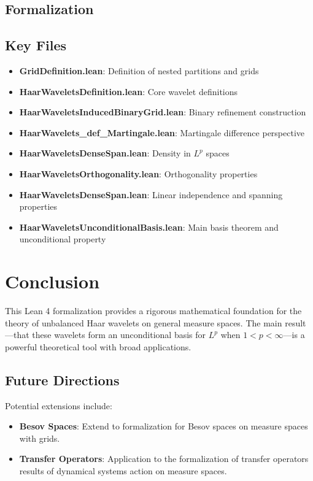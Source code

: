 \documentclass[12pt,a4paper]{article}
\theoremstyle{definition}
\newcommand{\Lp}[1]{L^{#1}}
\begin{document}
 
\newpage

 \subsection{Formalization} 
\subsection{Key Files}

\begin{itemize}
  \item \textbf{GridDefinition.lean}: Definition of nested partitions and grids
  \item \textbf{HaarWaveletsDefinition.lean}: Core wavelet definitions
  \item \textbf{HaarWaveletsInducedBinaryGrid.lean}: Binary refinement construction
  \item \textbf{HaarWavelets\_def\_Martingale.lean}: Martingale difference perspective
  \item \textbf{HaarWaveletsDenseSpan.lean}: Density in $\Lp{p}$ spaces
  \item \textbf{HaarWaveletsOrthogonality.lean}: Orthogonality properties
  \item \textbf{HaarWaveletsDenseSpan.lean}: Linear independence and spanning properties
  \item \textbf{HaarWaveletsUnconditionalBasis.lean}: Main basis theorem and unconditional property
\end{itemize}

\newpage

\section{Conclusion}

This Lean 4 formalization provides a rigorous mathematical foundation for the theory of unbalanced Haar wavelets on general measure spaces. The main result—that these wavelets form an unconditional basis for $\Lp{p}$ when $1 < p < \infty$—is a powerful theoretical tool with broad applications.

\subsection{Future Directions}

Potential extensions   include:

\begin{itemize}
  \item \textbf{Besov Spaces}: Extend to formalization for   Besov spaces on measure spaces with grids. 
  \item \textbf{Transfer Operators}: Application to the formalization of   transfer operators results of dynamical systems action on  measure spaces.
\end{itemize}

 
\end{document}
